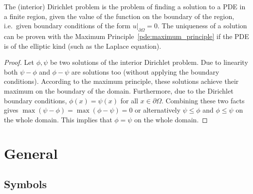     The (interior) Dirichlet problem is the problem of finding a solution to a PDE in a finite region, given the value of the function on the boundary of the region, i.e.~given boundary conditions of the form $u|_{\partial\Omega}=0$. The uniqueness of a solution can be proven with the Maximum Principle~\ref{pde:maximum_principle} if the PDE is of the elliptic kind (such as the Laplace equation).
    \begin{proof}
        Let $\phi,\psi$ be two solutions of the interior Dirichlet problem. Due to linearity both $\psi-\phi$ and $\phi-\psi$ are solutions too (without applying the boundary conditions). According to the maximum principle, these solutions achieve their maximum on the boundary of the domain. Furthermore, due to the Dirichlet boundary conditions, $\phi(x)=\psi(x)$ for all $x\in\partial\Omega$. Combining these two facts gives $\max(\psi-\phi) = \max(\phi-\psi) = 0$ or alternatively $\psi\leq\phi$ and $\phi\leq\psi$ on the whole domain. This implies that $\phi=\psi$ on the whole domain.
    \end{proof}



\section{General}\label{section:pde_general}
\subsection{Symbols}


